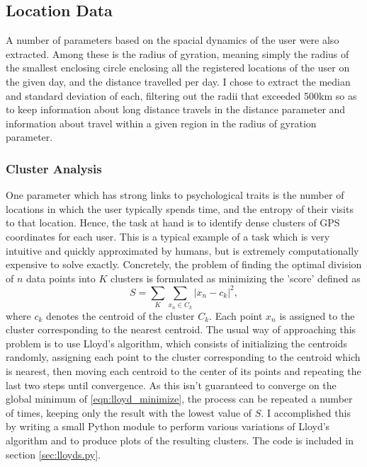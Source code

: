 \subsection{Location Data}
A number of parameters based on the spacial dynamics of the user were also extracted. Among these is the radius of gyration, meaning simply the radius of the smallest enclosing circle enclosing all the registered locations of the user on the given day, and the distance travelled per day. I chose to extract the median and standard deviation of each, filtering out the radii that exceeded 500km so as to keep information about long distance travels in the distance parameter and information about travel within a given region in the radius of gyration parameter.

\subsubsection{Cluster Analysis}
One parameter which has strong links\cite{demontjoye2013} to psychological traits is the number of locations in which the user typically spends time, and the entropy of their visits to that location. Hence, the task at hand is to identify dense clusters of GPS coordinates for each user. This is a typical example of a task which is very intuitive and quickly approximated by humans, but is extremely computationally expensive to solve exactly. Concretely, the problem of finding the optimal division of $n$ data points into $K$ clusters is formulated as minimizing the 'score' defined as
\begin{equation}
	S = \sum_K \sum_{x_n \in C_k} |x_n - c_k|^2, \label{eqn:lloyd_minimize}
\end{equation}
where $c_k$ denotes the centroid of the cluster $C_k$. Each point $x_n$ is assigned to the cluster corresponding to the nearest centroid. The usual way of approaching this problem is to use Lloyd's algorithm, which consists of initializing the centroids randomly, assigning each point to the cluster corresponding to the centroid which is nearest, then moving each centroid to the center of its points and repeating the last two steps until convergence. As this isn't guaranteed to converge on the global minimum of \eqref{eqn:lloyd_minimize}, the process can be repeated a number of times, keeping only the result with the lowest value of $S$. I accomplished this by writing a small Python module to perform various variations of Lloyd's algorithm and to produce plots of the resulting clusters. The code is included in section \ref{sec:lloyds.py}.

